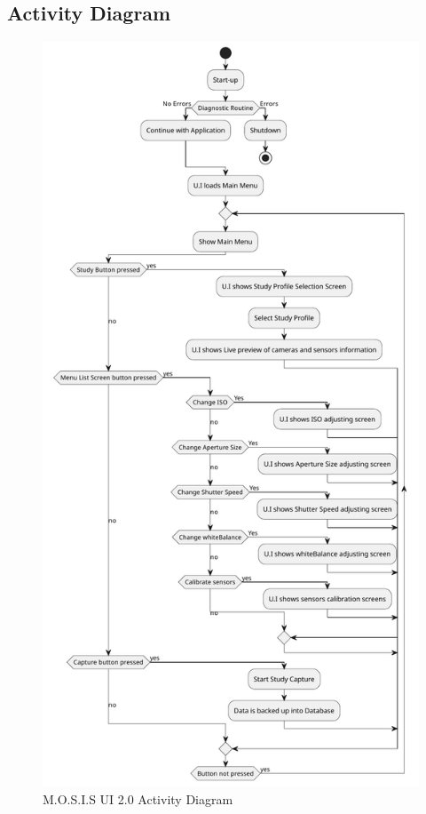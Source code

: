 \newpage
\subsection{Activity Diagram}
\begin{figure}[H]
  \begin{center}
    \includegraphics[page=1,height=0.9\textheight]{../Appendix/Design_Documentation/Activity_Diagram/Figures/activity.pdf}
  \end{center}
    \caption{M.O.S.I.S UI 2.0 Activity Diagram}
\end{figure}
